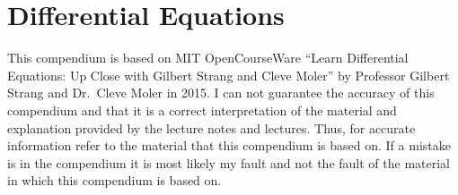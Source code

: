 \chapter{Differential Equations}
This compendium is based on MIT OpenCourseWare ``Learn Differential Equations: Up Close with Gilbert Strang and Cleve Moler'' by Professor Gilbert Strang and Dr.~Cleve Moler in 2015.
I can not guarantee the accuracy of this compendium and that it is a correct interpretation of the material and explanation provided by the lecture notes and lectures. Thus, for accurate information refer to the material that this compendium is based on. If a mistake is in the compendium it is most likely my fault and not the fault of the material in which this compendium is based on.


